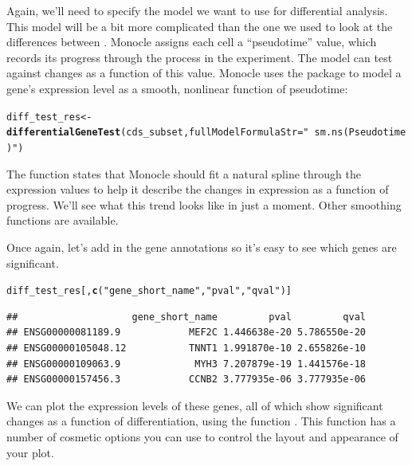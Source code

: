 \documentclass[10pt,oneside]{article}\usepackage[]{graphicx}\usepackage[]{color}
\makeatletter
\newcommand{\hlstr}[1]{\textcolor[rgb]{0.192,0.494,0.8}{#1}}%
\newcommand{\hlstd}[1]{\textcolor[rgb]{0.345,0.345,0.345}{#1}}%
\newcommand{\hlkwb}[1]{\textcolor[rgb]{0.69,0.353,0.396}{#1}}%
\newcommand{\hlkwc}[1]{\textcolor[rgb]{0.333,0.667,0.333}{#1}}%
\newcommand{\hlkwd}[1]{\textcolor[rgb]{0.737,0.353,0.396}{\textbf{#1}}}%
\newenvironment{kframe}{%
 \def\at@end@of@kframe{}%
 \ifinner\ifhmode%
  \def\at@end@of@kframe{\end{minipage}}%
  \begin{minipage}{\columnwidth}%
 \fi\fi%
 \def\FrameCommand##1{\hskip\@totalleftmargin \hskip-\fboxsep
 \colorbox{shadecolor}{##1}\hskip-\fboxsep
     \hskip-\linewidth \hskip-\@totalleftmargin \hskip\columnwidth}%
 \MakeFramed {\advance\hsize-\width
   \@totalleftmargin\z@ \linewidth\hsize
   \@setminipage}}%
 {\par\unskip\endMakeFramed%
 \at@end@of@kframe}
\newenvironment{knitrout}{}{} %
\makeatother
\begin{document}
Again, we'll need to specify the model we want to use for differential analysis.  This model will be a bit more complicated than the one we used to look at the differences between .  Monocle assigns each cell a ``pseudotime'' value, which records its progress through the process in the experiment.  The model can test against changes as a function of this value. Monocle uses the  package to model a gene's expression level as a smooth, nonlinear function of pseudotime:
\begin{knitrout}
\color{fgcolor}\begin{kframe}
\begin{alltt}
\hlstd{diff_test_res} \hlkwb{<-} \hlkwd{differentialGeneTest}\hlstd{(cds_subset,}  \hlkwc{fullModelFormulaStr}\hlstd{=}\hlstr{"~sm.ns(Pseudotime)"}\hlstd{)}
\end{alltt}
\end{kframe}
\end{knitrout}

The  function states that Monocle should fit a natural spline through the expression values to help it describe the changes in expression as a function of progress. We'll see what this trend looks like in just a moment. Other smoothing functions are available.

Once again, let's add in the gene annotations so it's easy to see which genes are significant.
\begin{knitrout}
\color{fgcolor}\begin{kframe}
\begin{alltt}
\hlstd{diff_test_res[,}\hlkwd{c}\hlstd{(}\hlstr{"gene_short_name"}\hlstd{,} \hlstr{"pval"}\hlstd{,} \hlstr{"qval"}\hlstd{)]}
\end{alltt}
\begin{verbatim}
##                    gene_short_name         pval         qval
## ENSG00000081189.9            MEF2C 1.446638e-20 5.786550e-20
## ENSG00000105048.12           TNNT1 1.991870e-10 2.655826e-10
## ENSG00000109063.9             MYH3 7.207879e-19 1.441576e-18
## ENSG00000157456.3            CCNB2 3.777935e-06 3.777935e-06
\end{verbatim}
\end{kframe}
\end{knitrout}

We can plot the expression levels of these genes, all of which show significant changes as a function of differentiation, using the function . This function has a number of cosmetic options you can use to control the layout and appearance of your plot.
\end{document}
